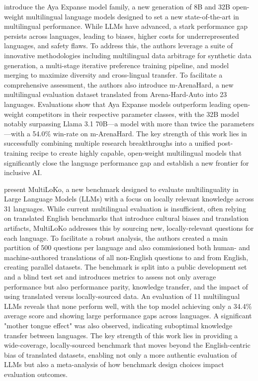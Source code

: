 \documentclass[acmsmall]{acmart}
\begin{document}
  \citep{dang2024aya} introduce the Aya Expanse model family, a new generation of 8B and 32B open-weight multilingual language models designed to set a new state-of-the-art in multilingual performance. While LLMs have advanced, a stark performance gap persists across languages, leading to biases, higher costs for underrepresented languages, and safety flaws. To address this, the authors leverage a suite of innovative methodologies including multilingual data arbitrage for synthetic data generation, a multi-stage iterative preference training pipeline, and model merging to maximize diversity and cross-lingual transfer. To facilitate a comprehensive assessment, the authors also introduce m-ArenaHard, a new multilingual evaluation dataset translated from Arena-Hard-Auto into 23 languages. Evaluations show that Aya Expanse models outperform leading open-weight competitors in their respective parameter classes, with the 32B model notably surpassing Llama 3.1 70B—a model with more than twice the parameters—with a 54.0\% win-rate on m-ArenaHard. The key strength of this work lies in successfully combining multiple research breakthroughs into a unified post-training recipe to create highly capable, open-weight multilingual models that significantly close the language performance gap and establish a new frontier for inclusive AI.

\citep{hupkes2025multiloko} present MultiLoKo, a new benchmark designed to evaluate multilinguality in Large Language Models (LLMs) with a focus on locally relevant knowledge across 31 languages. While current multilingual evaluation is insufficient, often relying on translated English benchmarks that introduce cultural biases and translation artifacts, MultiLoKo addresses this by sourcing new, locally-relevant questions for each language. To facilitate a robust analysis, the authors created a main partition of 500 questions per language and also commissioned both human- and machine-authored translations of all non-English questions to and from English, creating parallel datasets. The benchmark is split into a public development set and a blind test set and introduces metrics to assess not only average performance but also performance parity, knowledge transfer, and the impact of using translated versus locally-sourced data. An evaluation of 11 multilingual LLMs reveals that none perform well, with the top model achieving only a 34.4\% average score and showing large performance gaps across languages. A significant "mother tongue effect" was also observed, indicating suboptimal knowledge transfer between languages. The key strength of this work lies in providing a wide-coverage, locally-sourced benchmark that moves beyond the English-centric bias of translated datasets, enabling not only a more authentic evaluation of LLMs but also a meta-analysis of how benchmark design choices impact evaluation outcomes.
\end{document}
